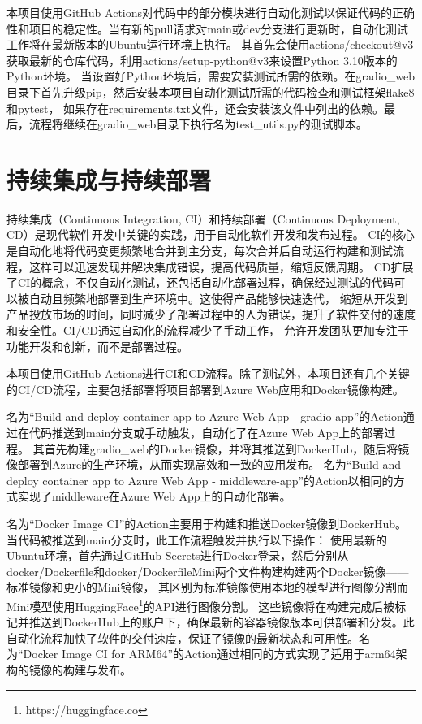 \documentclass[a4paper,AutoFakeBold,oneside,12pt]{book}
\begin{document}
本项目使用GitHub Actions对代码中的部分模块进行自动化测试以保证代码的正确性和项目的稳定性。当有新的pull请求对main或dev分支进行更新时，自动化测试工作将在最新版本的Ubuntu运行环境上执行。
其首先会使用actions/checkout@v3获取最新的仓库代码，利用actions/setup-python@v3来设置Python 3.10版本的Python环境。
当设置好Python环境后，需要安装测试所需的依赖。在gradio\_web目录下首先升级pip，然后安装本项目自动化测试所需的代码检查和测试框架flake8和pytest，
如果存在requirements.txt文件，还会安装该文件中列出的依赖。最后，流程将继续在gradio\_web目录下执行名为test\_utils.py的测试脚本。

\section{持续集成与持续部署}
持续集成（Continuous Integration, CI）和持续部署（Continuous Deployment, CD）是现代软件开发中关键的实践，用于自动化软件开发和发布过程。
CI的核心是自动化地将代码变更频繁地合并到主分支，每次合并后自动运行构建和测试流程，这样可以迅速发现并解决集成错误，提高代码质量，缩短反馈周期。
CD扩展了CI的概念，不仅自动化测试，还包括自动化部署过程，确保经过测试的代码可以被自动且频繁地部署到生产环境中。这使得产品能够快速迭代，
缩短从开发到产品投放市场的时间，同时减少了部署过程中的人为错误，提升了软件交付的速度和安全性。CI/CD通过自动化的流程减少了手动工作，
允许开发团队更加专注于功能开发和创新，而不是部署过程。

本项目使用GitHub Actions进行CI和CD流程。除了测试外，本项目还有几个关键的CI/CD流程，主要包括部署将项目部署到Azure Web应用和Docker镜像构建。

名为“Build and deploy container app to Azure Web App - gradio-app”的Action通过在代码推送到main分支或手动触发，自动化了在Azure Web App上的部署过程。
其首先构建gradio\_web的Docker镜像，并将其推送到DockerHub，随后将镜像部署到Azure的生产环境，从而实现高效和一致的应用发布。
名为“Build and deploy container app to Azure Web App - middleware-app”的Action以相同的方式实现了middleware在Azure Web App上的自动化部署。

名为“Docker Image CI”的Action主要用于构建和推送Docker镜像到DockerHub。当代码被推送到main分支时，此工作流程触发并执行以下操作：
使用最新的Ubuntu环境，首先通过GitHub Secrets进行Docker登录，然后分别从docker/Dockerfile和docker/DockerfileMini两个文件构建构建两个Docker镜像——标准镜像和更小的Mini镜像，
其区别为标准镜像使用本地的模型进行图像分割而Mini模型使用HuggingFace\footnote{https://huggingface.co}的API进行图像分割。
这些镜像将在构建完成后被标记并推送到DockerHub上的账户下，确保最新的容器镜像版本可供部署和分发。此自动化流程加快了软件的交付速度，保证了镜像的最新状态和可用性。名为“Docker Image CI for ARM64”的Action通过相同的方式实现了适用于arm64架构的镜像的构建与发布。
\end{document}
